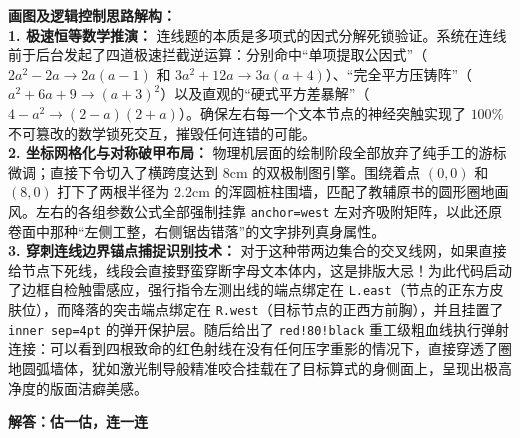 \vspace{0.4cm}
{\small\color{blue!70!black}
\textbf{画图及逻辑控制思路解构：}\\
\textbf{1. 极速恒等数学推演：} 连线题的本质是多项式的因式分解死锁验证。系统在连线前于后台发起了四道极速拦截逆运算：分别命中“单项提取公因式”（$2a^2 - 2a \rightarrow 2a(a - 1)$ 和 $3a^2 + 12a \rightarrow 3a(a + 4)$）、“完全平方压铸阵”（$a^2 + 6a + 9 \rightarrow (a+3)^2$）以及直观的“硬式平方差暴解”（$4 - a^2 \rightarrow (2-a)(2+a)$）。确保左右每一个文本节点的神经突触实现了 $100\%$ 不可篡改的数学锁死交互，摧毁任何连错的可能。\\
\textbf{2. 坐标网格化与对称破甲布局：} 物理机层面的绘制阶段全部放弃了纯手工的游标微调；直接下令切入了横跨度达到 $8\mathrm{cm}$ 的双极制图引擎。围绕着点 $(0,0)$ 和 $(8,0)$ 打下了两根半径为 $2.2\mathrm{cm}$ 的浑圆桩柱围墙，匹配了教辅原书的圆形圈地画风。左右的各组参数公式全部强制挂靠 \texttt{anchor=west} 左对齐吸附矩阵，以此还原卷面中那种“左侧工整，右侧锯齿错落”的文字排列真身属性。\\
\textbf{3. 穿刺连线边界锚点捕捉识别技术：} 对于这种带两边集合的交叉线网，如果直接给节点下死线，线段会直接野蛮穿断字母文本体内，这是排版大忌！为此代码启动了边框自检触雷感应，强行指令左测出线的端点绑定在 \texttt{L.east}（节点的正东方皮肤位），而降落的突击端点绑定在 \texttt{R.west}（目标节点的正西方前胸），并且挂置了 \texttt{inner sep=4pt} 的弹开保护层。随后给出了 \texttt{red!80!black} 重工级粗血线执行弹射连接：可以看到四根致命的红色射线在没有任何压字重影的情况下，直接穿透了圈地圆弧墙体，犹如激光制导般精准咬合挂载在了目标算式的身侧面上，呈现出极高净度的版面洁癖美感。
}
\newpage

\newpage

\newpage

\begin{center}
  {\large\bfseries 解答：估一估，连一连}
\end{center}

\vspace{1cm}

